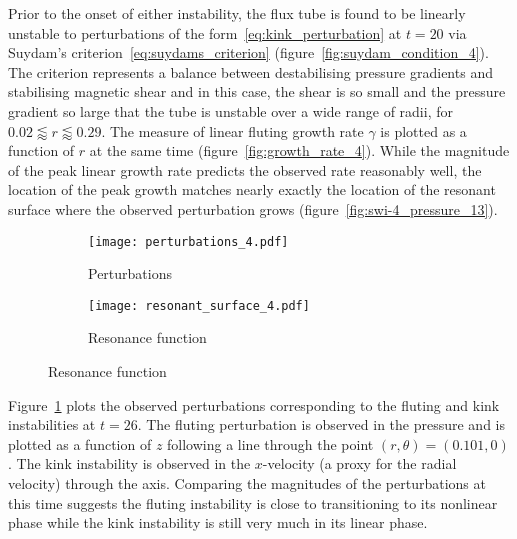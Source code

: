 Prior to the onset of either instability, the flux tube is found to be linearly unstable to perturbations of the form~\eqref{eq:kink_perturbation} at $t=20$ via Suydam's criterion~\eqref{eq:suydams_criterion} (figure~\ref{fig:suydam_condition_4}). The criterion represents a balance between destabilising pressure gradients and stabilising magnetic shear and in this case, the shear is so small and the pressure gradient so large that the tube is unstable over a wide range of radii, for $ 0.02 \lessapprox r \lessapprox 0.29$. The measure of linear fluting growth rate $\gamma$ is plotted as a function of $r$ at the same time (figure~\ref{fig:growth_rate_4}). While the magnitude of the peak linear growth rate predicts the observed rate reasonably well, the location of the peak growth matches nearly exactly the location of the resonant surface where the observed perturbation grows (figure~\ref{fig:swi-4_pressure_13}).

\begin{figure}[t]
  \centering
    \begin{subfigure}{0.49\textwidth}
      \texttt{[image: perturbations\_4.pdf]}
      \caption{Perturbations}
      \label{fig:pressure_pert_4}
    \end{subfigure}
    \hfill
    \begin{subfigure}{0.49\textwidth}
      \texttt{[image: resonant\_surface\_4.pdf]}
      \caption{Resonance function}
      \label{fig:resonant_surface_4}
    \end{subfigure}
\label{fig:k_and_resonance}%
\end{figure}

Figure~\ref{fig:pressure_pert_4} plots the observed perturbations corresponding to the fluting and kink instabilities at $t=26$. The fluting perturbation is observed in the pressure and is plotted as a function of $z$ following a line through the point $(r, \theta) = (0.101, 0)$. The kink instability is observed in the $x$-velocity (a proxy for the radial velocity) through the axis. Comparing the magnitudes of the perturbations at this time suggests the fluting instability is close to transitioning to its nonlinear phase while the kink instability is still very much in its linear phase.

